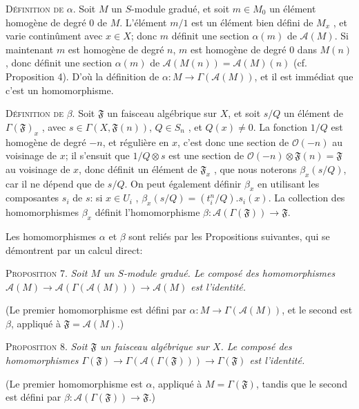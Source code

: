 
\textsc{Définition de} $\alpha$. Soit $M$ un $S$-module gradué, et soit $m \in M_{0}$ un élément homogène de degré 0 de $M$. L'élément $m/1$ est un élément bien défini de $M_{x}$ , et varie continûment avec $x \in X$; donc $m$ définit une section $\alpha(m)$ de $\mathcal{A}(M)$. Si maintenant $m$ est homogène de degré $n$, $m$ est homogène de degré 0 dans $M(n)$, donc définit une section $\alpha(m)$ de $\mathcal{A}(M(n)) = \mathcal{A}(M)(n)$ (cf. Proposition 4). D'où la définition de $\alpha : M \to \Gamma(\mathcal{A}(M))$, et il est immédiat que c'est un homomorphisme.

\textsc{Définition de} $\beta$. Soit $\mathfrak{F}$ un faisceau algébrique sur $X$, et soit $s/Q$ un élément de $\Gamma(\mathfrak{F})_{x}$ , avec $s \in \Gamma(X, \mathfrak{F}(n))$, $Q \in S_{n}$ , et $Q(x) \neq 0$. La fonction $1/Q$ est homogène de degré $-n$, et régulière en $x$, c'est donc une section de $\mathcal{O}(-n)$ au voisinage de $x$; il s'ensuit que $1/Q \otimes s$ est une section de $\mathcal{O}(-n) \otimes \mathfrak{F}(n) = \mathfrak{F}$ au voisinage de $x$, donc définit un élément de $\mathfrak{F}_{x}$ , que nous noterons $\beta_{x}(s/Q)$, car il ne dépend que de $s/Q$. On peut également définir $\beta_{x}$ en utilisant les composantes $s_{i}$ de $s$: si $x \in U_{i}$ , $\beta_{x}(s/Q) = (t_{i}^{n}/Q).s_{i}(x)$. La collection des homomorphismes $\beta_{x}$ définit l'homomorphisme $\beta : \mathcal{A}(\Gamma(\mathfrak{F})) \to \mathfrak{F}$.

Les homomorphismes $\alpha$ et $\beta$ sont reliés par les Propositions suivantes, qui se démontrent par un calcul direct:

\textsc{Proposition} 7. \textit{Soit $M$ un $S$-module gradué. Le composé des homomorphismes $\mathcal{A}(M) \to \mathcal{A}(\Gamma(\mathcal{A}(M))) \to \mathcal{A}(M)$ est l'identité.}

(Le premier homomorphisme est défini par $\alpha : M \to \Gamma(\mathcal{A}(M))$, et le second est $\beta$, appliqué à $\mathfrak{F} = \mathcal{A}(M)$.)

\textsc{Proposition} 8. \textit{Soit $\mathfrak{F}$ un faisceau algébrique sur $X$. Le composé des homomorphismes $\Gamma(\mathfrak{F}) \to \Gamma(\mathcal{A}(\Gamma(\mathfrak{F}))) \to \Gamma(\mathfrak{F})$ est l'identité.}

(Le premier homomorphisme est $\alpha$, appliqué à $M = \Gamma(\mathfrak{F})$, tandis que le second est défini par $\beta : \mathcal{A}(\Gamma(\mathfrak{F})) \to \mathfrak{F}$.)

